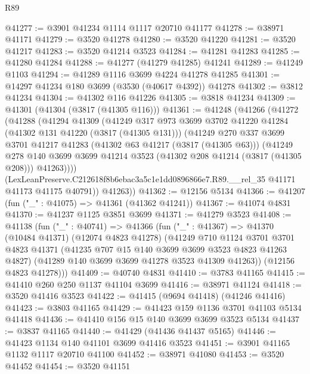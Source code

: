 \begin{lexlean}{R89}
\begin{coremodule}
@41277 := @3901 @41234 @1114 @1117 @20710 @41177
@41278 := @38971 @41171
@41279 := @3520 @41278
@41280 := @3520 @41220
@41281 := @3520 @41217
@41283 := @3520 @41214 @3523
@41284 := @41281 @41283
@41285 := @41280 @41284
@41288 := @41277 (@41279 @41285) @41241
@41289 := @41249 @1103
@41294 := @41289 @1116 @3699 @4224 @41278 @41285
@41301 := @14297 @41234 @180 @3699 (@3530 (@40617 @4392)) @41278
@41302 := @3812 @41234
@41304 := @41302 @116 @41226
@41305 := @3818 @41234
@41309 := @41301 (@41304 (@3817 (@41305 @116)))
@41361 := @41248
    (@41266
      (@41272
        (@41288
          (@41294
            @41309
            (@41249
              @317
              @973
              @3699
              @3702
              @41220
              @41284
              (@41302 @131 @41220 (@3817 (@41305 @131)))
              (@41249
                @270
                @337
                @3699
                @3701
                @41217
                @41283
                (@41302 @63 @41217 (@3817 (@41305 @63)))
                (@41249
                  @278
                  @140
                  @3699
                  @3699
                  @41214
                  @3523
                  (@41302 @208 @41214 (@3817 (@41305 @208)))
                  @41263))))
          (LexLeanPreserve.C212618f8b6ebac3a5c1e1dd0896866e7.R89.__rel_35
            @41171
            @41173
            @41175
            @40791))
        @41263))
@41362 := @12156 @5134
@41366 := @41207 (fun ("_" : @41075) => @41361 (@41362 @41241))
@41367 := @41074 @4831
@41370 := @41237 @1125 @3851 @3699
@41371 := @41279 @3523
@41408 := @41138
    (fun ("_" : @40741) =>
    @41366
      (fun ("_" : @41367) =>
      @41370
        (@10484 @41371)
        (@12074 @4823 @41278)
        (@41249
          @710
          @1124
          @3701
          @3701
          @4823
          @41371
          (@41235 @707 @15 @140 @3699 @3699 @3523 @4823 @41263 @4827)
          (@41289 @140 @3699 @3699 @41278 @3523 @41309 @41263))
        (@12156 @4823 @41278)))
@41409 := @40740 @4831
@41410 := @3783 @41165
@41415 := @41410 @260 @250 @1137 @41104 @3699
@41416 := @38971 @41124
@41418 := @3520 @41416 @3523
@41422 := @41415 (@9694 @41418) (@41246 @41416)
@41423 := @3803 @41165
@41429 := @41423 @159 @1136 @3701 @41103 @5134 @41418
@41436 := @41410 @156 @15 @140 @3699 @3699 @3523 @5134
@41437 := @3837 @41165
@41440 := @41429 (@41436 @41437 @5165)
@41446 := @41423 @1134 @140 @41101 @3699 @41416 @3523
@41451 := @3901 @41165 @1132 @1117 @20710 @41100
@41452 := @38971 @41080
@41453 := @3520 @41452
@41454 := @3520 @41151

\end{coremodule}
\end{lexlean}
